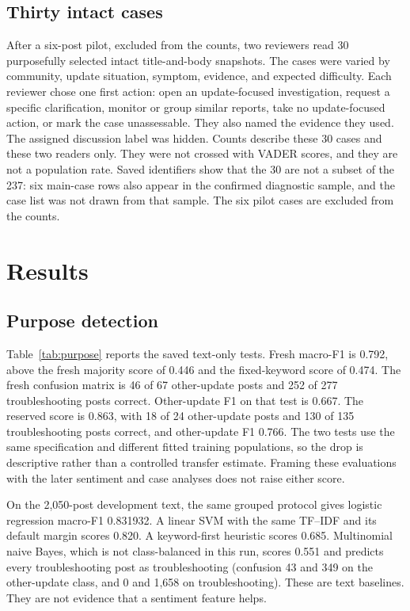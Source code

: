\documentclass[conference,letterpaper]{IEEEtran}
\begin{document}
\subsection{Thirty intact cases}
After a six-post pilot, excluded from the counts, two reviewers read 30 purposefully selected intact title-and-body snapshots. The cases were varied by community, update situation, symptom, evidence, and expected difficulty. Each reviewer chose one first action: open an update-focused investigation, request a specific clarification, monitor or group similar reports, take no update-focused action, or mark the case unassessable. They also named the evidence they used. The assigned discussion label was hidden. Counts describe these 30 cases and these two readers only. They were not crossed with VADER scores, and they are not a population rate. Saved identifiers show that the 30 are not a subset of the 237: six main-case rows also appear in the confirmed diagnostic sample, and the case list was not drawn from that sample. The six pilot cases are excluded from the counts.

\section{Results}
\subsection{Purpose detection}
Table~\ref{tab:purpose} reports the saved text-only tests. Fresh macro-F1 is 0.792, above the fresh majority score of 0.446 and the fixed-keyword score of 0.474. The fresh confusion matrix is 46 of 67 other-update posts and 252 of 277 troubleshooting posts correct. Other-update F1 on that test is 0.667. The reserved score is 0.863, with 18 of 24 other-update posts and 130 of 135 troubleshooting posts correct, and other-update F1 0.766. The two tests use the same specification and different fitted training populations, so the drop is descriptive rather than a controlled transfer estimate. Framing these evaluations with the later sentiment and case analyses does not raise either score.

On the 2,050-post development text, the same grouped protocol gives logistic regression macro-F1 0.831932. A linear SVM with the same TF--IDF and its default margin scores 0.820. A keyword-first heuristic scores 0.685. Multinomial naive Bayes, which is not class-balanced in this run, scores 0.551 and predicts every troubleshooting post as troubleshooting (confusion 43 and 349 on the other-update class, and 0 and 1,658 on troubleshooting). These are text baselines. They are not evidence that a sentiment feature helps.
\end{document}
